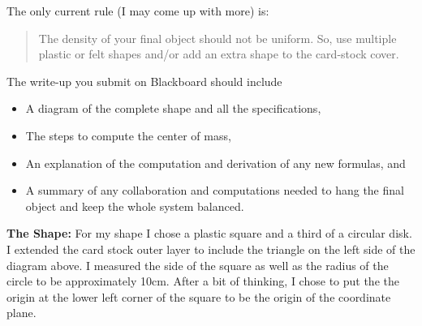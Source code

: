 \documentclass[12pt]{amsart}
\begin{document}
\bigskip

The only current rule (I may come up with more) is:

\begin{quote}The density of your final object should not be uniform.  So, use multiple plastic or felt shapes and/or add an extra shape to the card-stock cover. \end{quote}

\bigskip

\bigskip

The write-up you submit on Blackboard should include 
\begin{itemize}
\item  A diagram of the complete shape and all the specifications,
\item  The steps to compute the center of mass,
\item  An explanation of the computation and derivation of any new formulas, and
\item  A summary of any collaboration and computations needed to hang the final object and keep the whole system balanced.
\end{itemize}

\newpage


\newpage

{\bf The Shape:}  For my shape I chose a plastic square and a third of a circular disk.  I extended the card stock outer layer to include the triangle on the left side of the diagram above.  I measured the side of the square as well as the radius of the circle to be approximately 10cm.  After a bit of thinking, I chose to put the the origin at the lower left corner of the square to be the origin of the coordinate plane.

\bigskip
\end{document}
